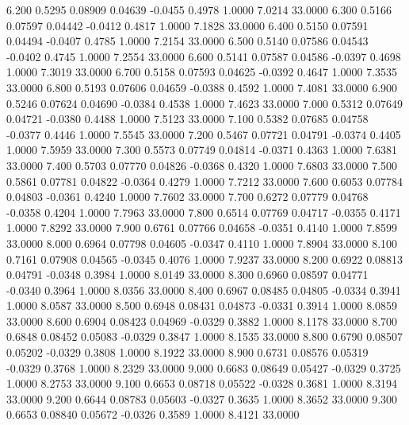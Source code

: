    6.200   0.5295   0.08909   0.04639  -0.0455   0.4978   1.0000   7.0214  33.0000
   6.300   0.5166   0.07597   0.04442  -0.0412   0.4817   1.0000   7.1828  33.0000
   6.400   0.5150   0.07591   0.04494  -0.0407   0.4785   1.0000   7.2154  33.0000
   6.500   0.5140   0.07586   0.04543  -0.0402   0.4745   1.0000   7.2554  33.0000
   6.600   0.5141   0.07587   0.04586  -0.0397   0.4698   1.0000   7.3019  33.0000
   6.700   0.5158   0.07593   0.04625  -0.0392   0.4647   1.0000   7.3535  33.0000
   6.800   0.5193   0.07606   0.04659  -0.0388   0.4592   1.0000   7.4081  33.0000
   6.900   0.5246   0.07624   0.04690  -0.0384   0.4538   1.0000   7.4623  33.0000
   7.000   0.5312   0.07649   0.04721  -0.0380   0.4488   1.0000   7.5123  33.0000
   7.100   0.5382   0.07685   0.04758  -0.0377   0.4446   1.0000   7.5545  33.0000
   7.200   0.5467   0.07721   0.04791  -0.0374   0.4405   1.0000   7.5959  33.0000
   7.300   0.5573   0.07749   0.04814  -0.0371   0.4363   1.0000   7.6381  33.0000
   7.400   0.5703   0.07770   0.04826  -0.0368   0.4320   1.0000   7.6803  33.0000
   7.500   0.5861   0.07781   0.04822  -0.0364   0.4279   1.0000   7.7212  33.0000
   7.600   0.6053   0.07784   0.04803  -0.0361   0.4240   1.0000   7.7602  33.0000
   7.700   0.6272   0.07779   0.04768  -0.0358   0.4204   1.0000   7.7963  33.0000
   7.800   0.6514   0.07769   0.04717  -0.0355   0.4171   1.0000   7.8292  33.0000
   7.900   0.6761   0.07766   0.04658  -0.0351   0.4140   1.0000   7.8599  33.0000
   8.000   0.6964   0.07798   0.04605  -0.0347   0.4110   1.0000   7.8904  33.0000
   8.100   0.7161   0.07908   0.04565  -0.0345   0.4076   1.0000   7.9237  33.0000
   8.200   0.6922   0.08813   0.04791  -0.0348   0.3984   1.0000   8.0149  33.0000
   8.300   0.6960   0.08597   0.04771  -0.0340   0.3964   1.0000   8.0356  33.0000
   8.400   0.6967   0.08485   0.04805  -0.0334   0.3941   1.0000   8.0587  33.0000
   8.500   0.6948   0.08431   0.04873  -0.0331   0.3914   1.0000   8.0859  33.0000
   8.600   0.6904   0.08423   0.04969  -0.0329   0.3882   1.0000   8.1178  33.0000
   8.700   0.6848   0.08452   0.05083  -0.0329   0.3847   1.0000   8.1535  33.0000
   8.800   0.6790   0.08507   0.05202  -0.0329   0.3808   1.0000   8.1922  33.0000
   8.900   0.6731   0.08576   0.05319  -0.0329   0.3768   1.0000   8.2329  33.0000
   9.000   0.6683   0.08649   0.05427  -0.0329   0.3725   1.0000   8.2753  33.0000
   9.100   0.6653   0.08718   0.05522  -0.0328   0.3681   1.0000   8.3194  33.0000
   9.200   0.6644   0.08783   0.05603  -0.0327   0.3635   1.0000   8.3652  33.0000
   9.300   0.6653   0.08840   0.05672  -0.0326   0.3589   1.0000   8.4121  33.0000
